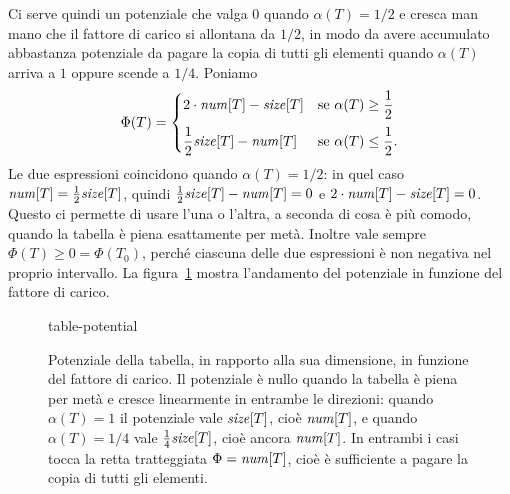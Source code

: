 Ci serve quindi un potenziale che valga $0$ quando $\alpha(T) = 1/2$ e cresca man mano che il fattore di carico si allontana da $1/2$, in modo da avere accumulato abbastanza potenziale da pagare la copia di tutti gli elementi quando $\alpha(T)$ arriva a $1$ oppure scende a $1/4$. Poniamo
\[
\Phi(T) = \begin{cases} 2\cdot\mathit{num}[T] - \mathit{size}[T] & \text{se } \alpha(T) \ge \dfrac{1}{2} \\[3mm] \dfrac{1}{2}\mathit{size}[T] - \mathit{num}[T] & \text{se } \alpha(T) \le \dfrac{1}{2}. \end{cases}
\]
Le due espressioni coincidono quando $\alpha(T) = 1/2$: in quel caso $\mathit{num}[T] = \frac{1}{2}\mathit{size}[T]$, quindi $\frac{1}{2}\mathit{size}[T] - \mathit{num}[T] = 0$ e $2\cdot\mathit{num}[T] - \mathit{size}[T] = 0$. Questo ci permette di usare l'una o l'altra, a seconda di cosa è più comodo, quando la tabella è piena esattamente per metà. Inoltre vale sempre $\Phi(T) \ge 0 = \Phi(T_0)$, perché ciascuna delle due espressioni è non negativa nel proprio intervallo. La figura~\ref{fig:ricarica} mostra l'andamento del potenziale in funzione del fattore di carico.

\begin{figure}[htbp]
\centering
\begin{widget}{table-potential}
\end{widget}
\caption{Potenziale della tabella, in rapporto alla sua dimensione, in funzione del fattore di carico. Il potenziale è nullo quando la tabella è piena per metà e cresce linearmente in entrambe le direzioni: quando $\alpha(T) = 1$ il potenziale vale $\mathit{size}[T]$, cioè $\mathit{num}[T]$, e quando $\alpha(T) = 1/4$ vale $\frac{1}{4}\mathit{size}[T]$, cioè ancora $\mathit{num}[T]$. In entrambi i casi tocca la retta tratteggiata $\Phi = \mathit{num}[T]$, cioè è sufficiente a pagare la copia di tutti gli elementi.}
\label{fig:ricarica}
\end{figure}

